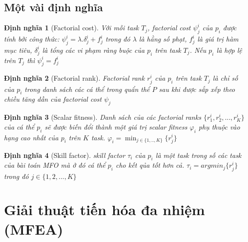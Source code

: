 \documentclass[a4paper,12pt]{report}
\newtheorem{definition}{Định nghĩa}[chapter]
\begin{document}
\subsection{Một vài định nghĩa}
\begin{definition}[Factorial cost]
Với mỗi task $T_j$, factorial cost $\psi_j^i$ của $p_i$ được tính bởi công thức: $\psi_j^i = \lambda . \delta_j^i + f_j^i$ trong đó $\lambda$ là hằng số phạt, $f_j^i$ là giá trị hàm mục tiêu, $\delta_j^i$ là tổng các vi phạm ràng buộc của $p_i$ trên task $T_j$. Nếu $p_i$ là hợp lệ trên $T_j$ thì $\psi_j^i = f_j^i$
\end{definition}

\begin{definition}[Factorial rank]
Factorial rank $r_j^i$ của $p_i$ trên task $T_j$ là chỉ số của $p_i$ trong danh sách các cá thể trong quẩn thể $P$ sau khi được sắp xếp theo chiều tăng dần của 	factorial cost $\psi_j$
\end{definition}

\begin{definition}[Scalar fitness]
Danh sách của các factorial ranks $\{r_1^i, r_2^i, ..., r_K^i\}$ của cá thể $p_i$ sẽ được biến đổi thành một giá trị scalar fitness $\varphi_i$ phụ thuộc vào hạng cao nhất của $p_i$ trên $K$ task. $\varphi_i = \displaystyle\min_{j \in \{1,..,K\}} \{r_j^i\}$ 
\end{definition}

\begin{definition}[Skill factor]
skill factor $\tau_i$ của $p_i$ là một task trong số các task của bài toán MFO mà ở đó cá thể $p_i$ cho kết qủa tốt hơn cả. $\tau_i = argmin_j\{r_j^i\}$ trong đó $j \in \{1, 2, ..., K\}$
\end{definition}

\section{Giải thuật tiến hóa đa nhiệm (MFEA)}
\end{document}
